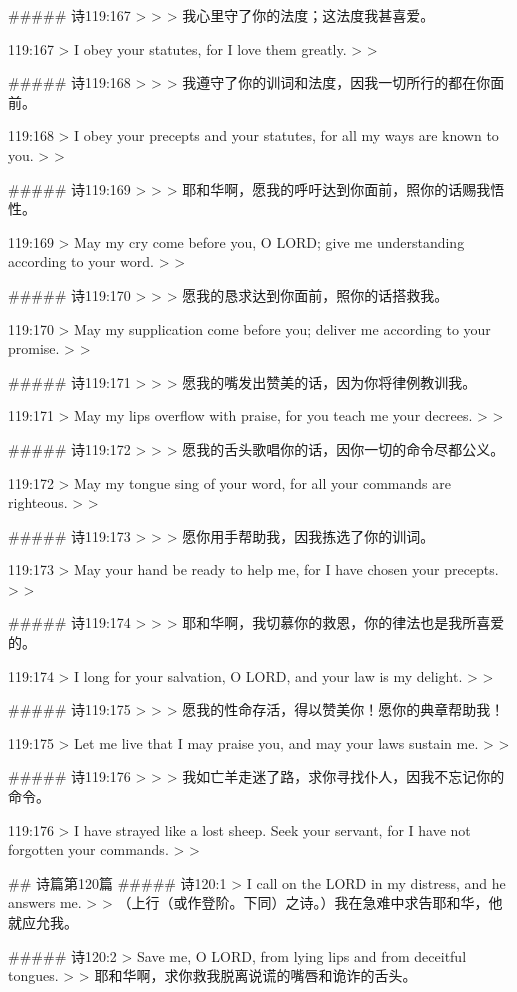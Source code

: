 ##### 诗119:167
> 
>
> 我心里守了你的法度；这法度我甚喜爱。


119:167
> I obey your statutes, for I love them greatly.
>
> 


##### 诗119:168
> 
>
> 我遵守了你的训词和法度，因我一切所行的都在你面前。


119:168
> I obey your precepts and your statutes, for all my ways are known to you.
>
> 


##### 诗119:169
> 
>
> 耶和华啊，愿我的呼吁达到你面前，照你的话赐我悟性。


119:169
> May my cry come before you, O LORD; give me understanding according to your word.
>
> 


##### 诗119:170
> 
>
> 愿我的恳求达到你面前，照你的话搭救我。


119:170
> May my supplication come before you; deliver me according to your promise.
>
> 


##### 诗119:171
> 
>
> 愿我的嘴发出赞美的话，因为你将律例教训我。


119:171
> May my lips overflow with praise, for you teach me your decrees.
>
> 


##### 诗119:172
> 
>
> 愿我的舌头歌唱你的话，因你一切的命令尽都公义。


119:172
> May my tongue sing of your word, for all your commands are righteous.
>
> 


##### 诗119:173
> 
>
> 愿你用手帮助我，因我拣选了你的训词。


119:173
> May your hand be ready to help me, for I have chosen your precepts.
>
> 


##### 诗119:174
> 
>
> 耶和华啊，我切慕你的救恩，你的律法也是我所喜爱的。


119:174
> I long for your salvation, O LORD, and your law is my delight.
>
> 


##### 诗119:175
> 
>
> 愿我的性命存活，得以赞美你！愿你的典章帮助我！


119:175
> Let me live that I may praise you, and may your laws sustain me.
>
> 


##### 诗119:176
> 
>
> 我如亡羊走迷了路，求你寻找仆人，因我不忘记你的命令。


119:176
> I have strayed like a lost sheep. Seek your servant, for I have not forgotten your commands.
>
> 


## 诗篇第120篇
##### 诗120:1
> I call on the LORD in my distress, and he answers me.
>
> （上行（或作登阶。下同）之诗。）我在急难中求告耶和华，他就应允我。


##### 诗120:2
> Save me, O LORD, from lying lips and from deceitful tongues.
>
> 耶和华啊，求你救我脱离说谎的嘴唇和诡诈的舌头。


